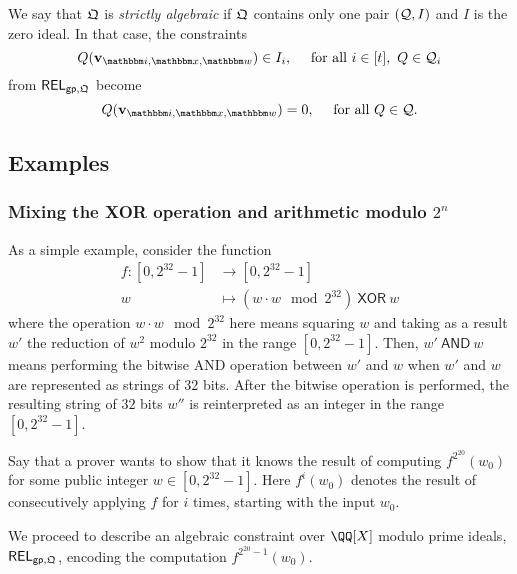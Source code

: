 \documentclass[11pt,letterpaper,usenames,dvipsnames]{article}
\begin{document}
    \begin{definition}\label{d: strictly_algebraic} We say that  $\mathfrak{Q}$ is \emph{strictly algebraic} if $\mathfrak{Q}$ contains only one pair $(\mathcal{Q}, I)$ and $I$ is the zero ideal.  In that case,  the constraints $$Q(\vv_{\idx, \inp,\wit})\in I_i, \quad \text{ for all } i\in [t],\ Q\in \cQ_i$$ from $\mathsf{REL}_{\mathsf{gp},\mathfrak{Q}}$ become $$Q(\vv_{\idx, \inp,\wit})=0, \quad  \text{ for all }Q\in \cQ.$$
    \end{definition}
    
\subsection{Examples}\label{s: example_sha}

\subsubsection{Mixing the XOR operation and arithmetic modulo $2^n$}

\newcommand{\AND}{\ \mathsf{AND}\ }
\newcommand{\XOR}{\ \mathsf{XOR}\ }

As a simple example, consider the function 
%
\begin{align*}
f: [0, 2^{32}-1] &\to [0, 2^{32}-1]\\
w &\mapsto (w\cdot w \mod 2^{32}) \XOR w
\end{align*}
%
where the operation $w\cdot w \mod 2^{32}$ here means squaring $w$ and taking as a result $w'$ the reduction of $w^2$ modulo $2^{32}$ in the range $[0,2^{32}-1]$. Then,  $w'\AND w$ means performing the bitwise AND operation between $w'$ and $w$ when $w'$ and $w$ are represented as strings of $32$ bits. After the bitwise operation is performed, the resulting string of $32$ bits $w''$ is reinterpreted as an integer in the range $[0, 2^{32}-1]$. 

Say that a prover wants to show that it knows the result of computing $f^{2^{20}}(w_0)$ for some public integer $w\in [0, 2^{32}-1]$. Here $f^{i}(w_0)$ denotes the result of consecutively applying $f$ for $i$ times, starting with the input $w_0$. 


We proceed to describe an algebraic  constraint over $\QQ[X]$ modulo prime ideals, $\mathsf{REL}_{\mathsf{gp}, \mathfrak{Q}}$, encoding the computation $f^{2^{20}-1}(w_0)$.
\end{document}
